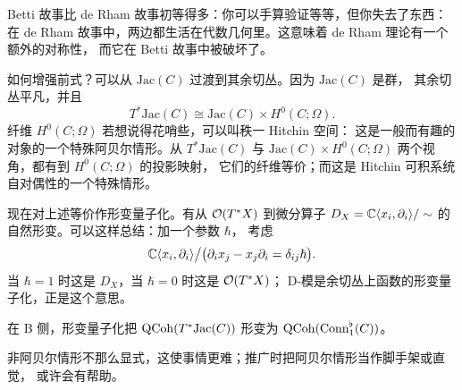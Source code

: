Betti 故事比 de Rham 故事初等得多：你可以手算验证等等，但你失去了东西：
在 de Rham 故事中，两边都生活在代数几何里。这意味着 de Rham 理论有一个额外的对称性，
而它在 Betti 故事中被破坏了。

如何增强前式？可以从 $\mathrm{Jac}(C)$ 过渡到其余切丛。因为 $\mathrm{Jac}(C)$ 是群，
其余切丛平凡，并且
\[
T^*\mathrm{Jac}(C)\cong \mathrm{Jac}(C)\times H^0(C;\Omega).
\]
纤维 $H^0(C;\Omega)$ 若想说得花哨些，可以叫秩一 Hitchin 空间：
这是一般而有趣的对象的一个特殊阿贝尔情形。从 $T^*\mathrm{Jac}(C)$ 与
$\mathrm{Jac}(C)\times H^0(C;\Omega)$ 两个视角，都有到 $H^0(C;\Omega)$ 的投影映射，
它们的纤维等价；而这是 Hitchin 可积系统自对偶性的一个特殊情形。

现在对上述等价作形变量子化。有从 $\mathcal{O}(T^*X)$ 到微分算子
$D_X=\mathbb{C}\langle x_i,\partial_i\rangle/\sim$ 的自然形变。可以这样总结：加一个参数 $\hbar$，
考虑
\[
\mathbb{C}\langle x_i,\partial_i\rangle\big/
\bigl(\partial_i x_j-x_j\partial_i=\delta_{ij}\hbar\bigr).
\]
当 $\hbar=1$ 时这是 $D_X$，当 $\hbar=0$ 时这是 $\mathcal{O}(T^*X)$；
D-模是余切丛上函数的形变量子化，正是这个意思。

在 B 侧，形变量子化把 $\mathrm{QCoh}(T^*\mathrm{Jac}(C))$ 形变为
$\mathrm{QCoh}(\mathrm{Conn}^{\flat}_1(C))$。

非阿贝尔情形不那么显式，这使事情更难；推广时把阿贝尔情形当作脚手架或直觉，
或许会有帮助。
